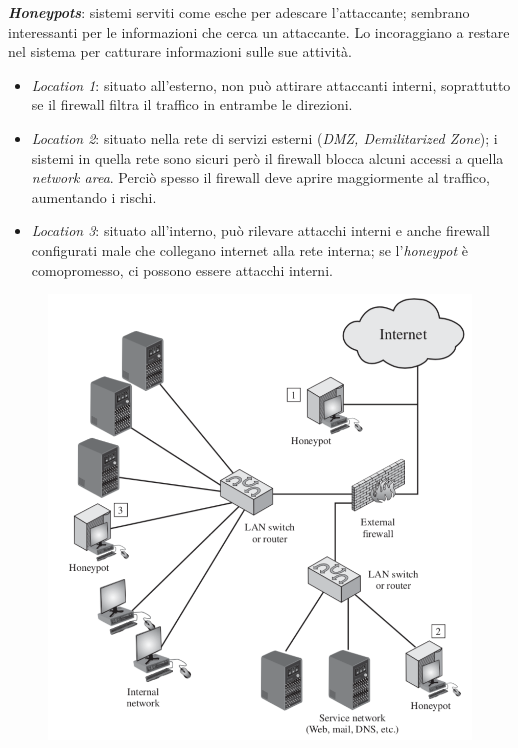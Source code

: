 \documentclass[11pt, a4paper, twoside, italian]{report}
\theoremstyle{plain}
\begin{document}
\begin{multicols}{2}
	\noindent
	\textit{\textbf{Honeypots}}: sistemi serviti come esche per adescare l'attaccante; sembrano interessanti per le informazioni che cerca un attaccante. Lo incoraggiano a restare nel sistema per catturare informazioni sulle sue attività.
	\begin{itemize}
		\item \textit{Location 1}: situato all'esterno, non può attirare attaccanti interni, soprattutto se il firewall filtra il traffico in entrambe le direzioni.
		\item \textit{Location 2}: situato nella rete  di servizi esterni (\textit{DMZ, Demilitarized Zone}); i sistemi in quella rete sono sicuri però il firewall blocca alcuni accessi a quella \textit{network area}. Perciò spesso il firewall deve aprire maggiormente al traffico, aumentando i rischi.
		\item \textit{Location 3}: situato all'interno, può rilevare attacchi interni e anche firewall configurati male che collegano internet alla rete interna; se l'\textit{honeypot} è comopromesso, ci possono essere attacchi interni.
	\end{itemize}
\columnbreak
	\begin{figure}[H]
		\centering
		\includegraphics[scale=0.55]{honeypot}
	\end{figure}
\end{multicols}
\end{document}
